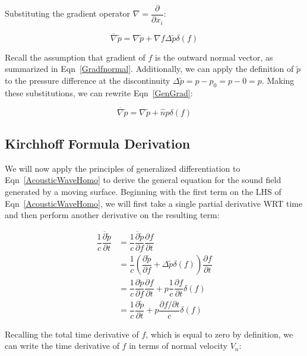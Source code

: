 \documentclass[]{aiaa-tc}%
\begin{document}
\noindent Substituting the gradient operator $\nabla = \dfrac{\partial}{\partial x_i}$:

\begin{equation} \label{GenGrad}
\overline{\nabla} \widetilde{p}
= \nabla\widetilde{p} + \nabla f \Delta\widetilde{p} \delta(f)
\end{equation}

Recall the assumption that gradient of $f$ is the outward normal vector, as summarized in Eqn~\ref{Gradfnormal}.  Additionally, we can apply the definition of $\widetilde{p}$ to the pressure difference at the discontinuity $\Delta\widetilde{p} = p - p_0 = p - 0 = p$.  Making these substitutions, we can rewrite Eqn~\ref{GenGrad}:

\begin{equation} \label{GenGradAssume}
\overline{\nabla} \widetilde{p}
= \nabla\widetilde{p} + \hat{n} p \delta(f)
\end{equation}


\subsection{Kirchhoff Formula Derivation}

We will now apply the principles of generalized differentiation to Eqn~\ref{AcousticWaveHomo} to derive the general equation for the sound field generated by a moving surface.  Beginning with the first term on the LHS of Eqn~\ref{AcousticWaveHomo}, we will first take a single partial derivative WRT time and then perform another derivative on the resulting term:

\begin{align*}
\dfrac{1}{c}\dfrac{\overline{\partial}\widetilde{p}}{\partial t}
&= \dfrac{1}{c}\dfrac{\overline{\partial}\widetilde{p}}{\partial f}
    \dfrac{\partial f}{\partial t} \\
&= \dfrac{1}{c}\left( \dfrac{\partial\widetilde{p}}{\partial f}
    + \Delta \widetilde{p} \delta(f) \right)
    \dfrac{\partial f}{\partial t} \\
&= \dfrac{1}{c}\dfrac{\partial\widetilde{p}}{\partial f} \dfrac{\partial f}{\partial t}
    + p \dfrac{1}{c}\dfrac{\partial f}{\partial t} \delta(f) \\
&= \dfrac{1}{c}\dfrac{\partial\widetilde{p}}{\partial t}
    + p \dfrac{\partial f / \partial t}{c} \delta(f)
\end{align*}

Recalling the total time derivative of $f$, which is equal to zero by definition, we can write the time derivative of $f$ in terms of normal velocity $V_n$:
\end{document}
